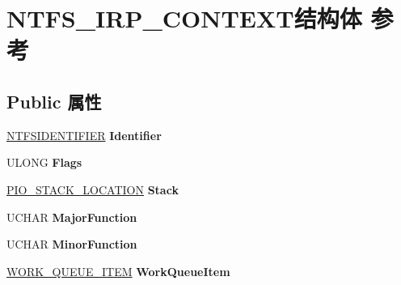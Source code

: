 \hypertarget{struct_n_t_f_s___i_r_p___c_o_n_t_e_x_t}{}\section{N\+T\+F\+S\+\_\+\+I\+R\+P\+\_\+\+C\+O\+N\+T\+E\+X\+T结构体 参考}
\label{struct_n_t_f_s___i_r_p___c_o_n_t_e_x_t}
\subsection*{Public 属性}
\begin{DoxyCompactItemize}
\item 
\mbox{\label{struct_n_t_f_s___i_r_p___c_o_n_t_e_x_t_a19f272adef6484c256bde50d9233d7d1}} 
\hyperlink{struct_n_t_f_s_i_d_e_n_t_i_f_i_e_r}{N\+T\+F\+S\+I\+D\+E\+N\+T\+I\+F\+I\+ER} {\bfseries Identifier}
\item 
\mbox{\label{struct_n_t_f_s___i_r_p___c_o_n_t_e_x_t_a89b61d8f0ee0e92cf2ecc85292739099}} 
U\+L\+O\+NG {\bfseries Flags}
\item 
\mbox{\label{struct_n_t_f_s___i_r_p___c_o_n_t_e_x_t_a9c56b5eefe7aa1491d9da9161a56703a}} 
\hyperlink{struct___i_o___s_t_a_c_k___l_o_c_a_t_i_o_n}{P\+I\+O\+\_\+\+S\+T\+A\+C\+K\+\_\+\+L\+O\+C\+A\+T\+I\+ON} {\bfseries Stack}
\item 
\mbox{\label{struct_n_t_f_s___i_r_p___c_o_n_t_e_x_t_a5f5137e8d8dd182533afce2846ec841f}} 
U\+C\+H\+AR {\bfseries Major\+Function}
\item 
\mbox{\label{struct_n_t_f_s___i_r_p___c_o_n_t_e_x_t_abd94dd54a9d5c99ef0dd884e3cd2c49b}} 
U\+C\+H\+AR {\bfseries Minor\+Function}
\item 
\mbox{\label{struct_n_t_f_s___i_r_p___c_o_n_t_e_x_t_ab87a2ac08d9d79fdc3fa81f51184d0b0}} 
\hyperlink{struct___w_o_r_k___q_u_e_u_e___i_t_e_m}{W\+O\+R\+K\+\_\+\+Q\+U\+E\+U\+E\+\_\+\+I\+T\+EM} {\bfseries Work\+Queue\+Item}
\item 
\mbox{\label{struct_n_t_f_s___i_r_p___c_o_n_t_e_x_t_a189701f4ab4b83c8733c197680e6cc86}} 

\end{DoxyCompactItemize}
